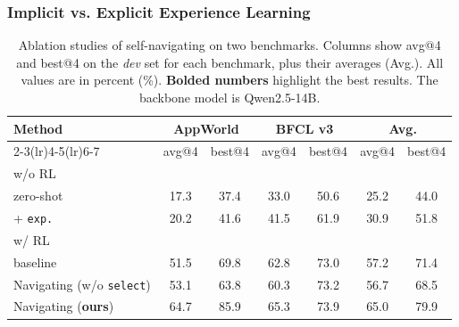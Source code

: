 \subsubsection{Implicit vs. Explicit Experience Learning}
\begin{table}[htbp]
    \centering
    \caption{Ablation studies of self-navigating on two benchmarks. Columns show avg@4 and best@4 on the \emph{dev} set for each benchmark, plus their averages (Avg.). All values are in percent (\%). \textbf{Bolded numbers} highlight the best results. The backbone model is Qwen2.5-14B. }
    \label{tab:navigate-ablation}
    \small
    \setlength{\tabcolsep}{8pt}
    \begin{tabular}{@{}l cc cc cc@{}}
    \toprule
    \textbf{Method} & 
    \multicolumn{2}{c}{\textbf{AppWorld}} &
    \multicolumn{2}{c}{\textbf{BFCL v3}} &
    \multicolumn{2}{c}{\textbf{Avg.}} \\
    \cmidrule(lr){2-3}\cmidrule(lr){4-5}\cmidrule(lr){6-7}
     & 
    avg@4 & best@4 &
    avg@4 & best@4 &
    avg@4 & best@4 \\
    \midrule
    w/o RL      &  &  &  &  &  & \\
    \quad zero-shot     & 17.3 & 37.4 & 33.0 & 50.6 & 25.2 & 44.0\\
    \quad + \texttt{exp.}    & 20.2 & 41.6 & 41.5 & 61.9 & 30.9 & 51.8\\
    \midrule
    w/ RL      &  &  &  &  &  & \\
    \quad baseline     & 51.5 & 69.8 & 62.8 & 73.0 & 57.2 & 71.4\\
    \quad Navigating (w/o \texttt{select})     & 53.1 & 63.8 & 60.3 & 73.2 & 56.7 & 68.5\\
    \rowcolor{gray!20}
    \quad Navigating (\textbf{ours})     & 64.7 & 85.9 & 65.3 & 73.9 & 65.0 & 79.9\\
    
    \bottomrule
    \end{tabular}
\end{table}

